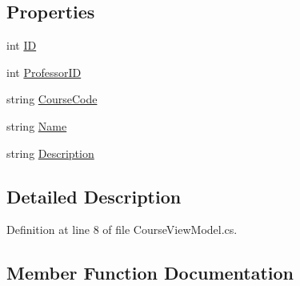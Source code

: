 \subsection*{Properties}
\begin{DoxyCompactItemize}
\item 
int \hyperlink{class_uni_enrollment___m_v_c_1_1_models_1_1_course_view_model_a6cdbca7e6c66c9505f4846935b355d6a}{ID}
\item 
int \hyperlink{class_uni_enrollment___m_v_c_1_1_models_1_1_course_view_model_a8fac888ed7328928c0551a8b0f2c85e8}{Professor\+ID}
\item 
string \hyperlink{class_uni_enrollment___m_v_c_1_1_models_1_1_course_view_model_abf48fa3094f898b40071925f91e25e58}{Course\+Code}
\item 
string \hyperlink{class_uni_enrollment___m_v_c_1_1_models_1_1_course_view_model_a0ef4a9c7d23d04916bdc2202afea3a3f}{Name}
\item 
string \hyperlink{class_uni_enrollment___m_v_c_1_1_models_1_1_course_view_model_a6f025e7e960e0cd91fb73c6e947e055d}{Description}
\end{DoxyCompactItemize}


\subsection{Detailed Description}


Definition at line 8 of file Course\+View\+Model.\+cs.



\subsection{Member Function Documentation}
